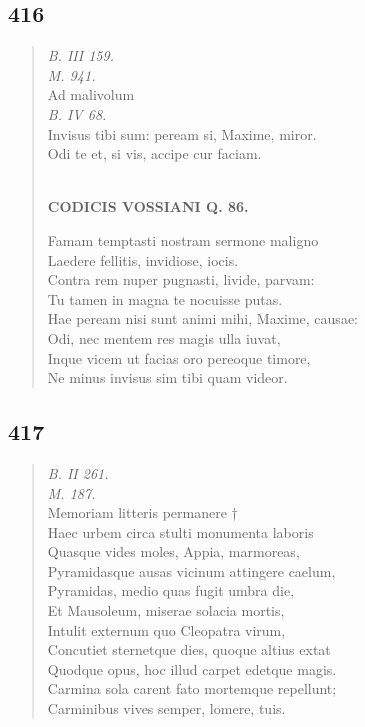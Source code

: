 \documentclass[11pt, a4paper]{report}
\begin{document}
            \subsection*{416}
      \begin{verse}
      \textit{B. III 159.} \\ \textit{M. 941.} \\ Ad malivolum \\ \textit{B. IV 68.} \\ Invisus tibi sum: peream si, Maxime, miror. \\ Odi te et, si vis, accipe cur faciam. \\ 
        ﻿\pagebreak 
    \begin{center} \textbf{CODICIS VOSSIANI Q. 86.} \end{center} \marginpar{[02]} Famam temptasti nostram sermone maligno \\ Laedere fellitis, invidiose, iocis. \\ Contra rem nuper pugnasti, livide, parvam: \\ Tu tamen in magna te nocuisse putas. \\ Hae peream nisi sunt animi mihi, Maxime, causae: \\ Odi, nec mentem res magis ulla iuvat, \\ Inque vicem ut facias oro pereoque timore, \\ Ne minus invisus sim tibi quam videor. \\ 
      \end{verse}
  
            \subsection*{417}
      \begin{verse}
      \textit{B. II 261.} \\ \textit{M. 187.} \\ Memoriam litteris permanere † \\ Haec urbem circa stulti monumenta laboris \\ Quasque vides moles, Appia, marmoreas, \\ Pyramidasque ausas vicinum attingere caelum, \\ Pyramidas, medio quas fugit umbra die, \\ Et Mausoleum, miserae solacia mortis, \\ Intulit externum quo Cleopatra virum, \\ Concutiet sternetque dies, quoque altius extat \\ Quodque opus, hoc illud carpet edetque magis. \\ Carmina sola carent fato mortemque repellunt; \\ Carminibus vives semper, lomere, tuis. \\ 
      \end{verse}
  
\end{document}

